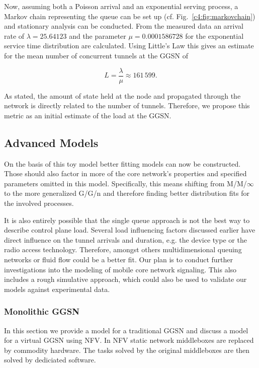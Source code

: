 Now, assuming both a Poisson arrival and an exponential serving process, a Markov chain representing the queue can be set up (cf. Fig.~\ref{c4:fig:markovchain}) and stationary analysis can be conducted. From the measured data an arrival rate of $\lambda=25.64123$ and the parameter $\mu=0.0001586728$ for the exponential service time distribution are calculated. Using Little's Law this gives an estimate for the mean number of concurrent tunnels at the \gls{GGSN} of 

$$
L=\frac{\lambda}{\mu}\approx 161\,599. %
$$

As stated, the amount of state held at the node and propagated through the network is directly related to the number of tunnels. Therefore, we propose this metric as an initial estimate of the load at the \gls{GGSN}.


\subsection{Advanced Models} 


On the basis of this toy model better fitting models can now be constructed. Those should also factor in more of the core network's properties and specified parameters omitted in this model. Specifically, this means shifting from M/M/$\infty$ to the more generalized G/G/n and therefore finding better distribution fits for the involved processes.

It is also entirely possible that the single queue approach is not the best way to describe control plane load. Several load influencing factors discussed earlier have direct influence on the tunnel arrivals and duration, e.g. the device type or the radio access technology. Therefore, amongst others multidimensional queuing networks or fluid flow could be a better fit. Our plan is to conduct further investigations into the modeling of mobile core network signaling. This also includes a rough simulative approach, which could also be used to validate our models against experimental data.


\subsubsection{Monolithic \texorpdfstring{\acrshort{GGSN}}{GGSN}}

In this section we provide a model for a traditional \gls{GGSN} and discuss a model for a virtual \gls{GGSN} using \gls{NFV}. In \gls{NFV} \cite{nfv_whitepaper} static network middleboxes are replaced by commodity hardware. The tasks solved by the original middleboxes are then solved by dediciated software.

